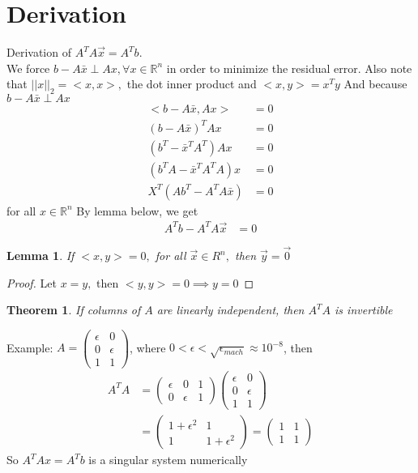 \documentclass[11pt,oneside]{book}
\theoremstyle{break}
\theoremstyle{break}
\newtheorem{thm}{Theorem}[section]
\newtheorem{lem}{Lemma}[thm]
\newcommand{\R}{\mathbb{R}}
\newcommand{\example}{\color{purple}Example: \color{black}}
\begin{document}
\section[Derivation]{Derivation}
Derivation of $A^TA\vec{x}=A^Tb$.\\
We force $b-A\bar{x}\perp Ax,\forall x \in \R^n$ in order to minimize the residual error. Also note that $||x||_2=<x,x>,$ the dot inner product and $<x,y>=x^Ty$ And because $b-A\bar{x}\perp Ax$\begin{align*}
<b-A\bar{x},Ax>&=0\\
(b-A\bar{x})^TAx&=0\\
(b^T-\bar{x}^TA^T)Ax&=0\\
(b^TA-\bar{x}^TA^TA)x&=0\\
X^T(Ab^T-A^TA\bar{x})&=0
\end{align*}
for all $x\in \R^n$
By lemma below, we get \begin{align*}
A^Tb-A^TA\vec{x}&=0
\end{align*}
\begin{lem}
If $<x,y>=0,$  for all $\vec{x}\in R^n,$ then $\vec{y}=\vec{0}$
\end{lem}
\begin{proof}
Let $x=y,$ then $<y,y>=0\implies y=0$
\end{proof}
\begin{thm}
If columns of $A$ are linearly independent, then $A^TA$ is invertible
\end{thm}
\example $A=\begin{pmatrix}
\epsilon &0\\
0&\epsilon\\
1&1
\end{pmatrix}$, where $0<\epsilon <\sqrt{\epsilon_{mach}}\approx 10^{-8}$, then \begin{align*}
A^TA&=\begin{pmatrix}
\epsilon &0 &1\\
0&\epsilon &1
\end{pmatrix}\begin{pmatrix}
\epsilon &0\\
0&\epsilon\\
1&1
\end{pmatrix}\\
&=\begin{pmatrix}
1+\epsilon^2&1\\
1&1+\epsilon^2
\end{pmatrix}=\begin{pmatrix}
1&1\\
1&1
\end{pmatrix}
\end{align*}
So $A^TAx=A^Tb$ is a singular system numerically
\end{document}
